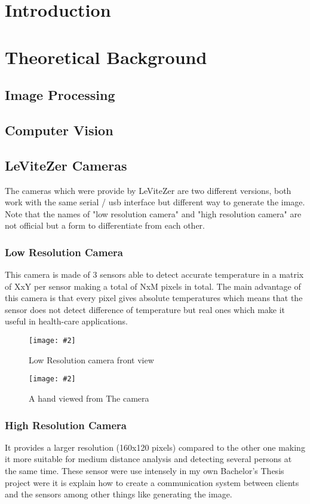 \documentclass[hidelinks,11pt,a4paper,oneside,article]{memoir}
\newcommand{\putimage}[3][10] %
{
    \begin{figure}[h]
        \centering
        \captionsetup{justification=centering}
        \texttt{[image: \#2]}
        \caption{#3}
        \label{fig:#2}
    \end{figure}
}
\begin{document}
	\setcounter{page}{1} %
	\ClearWallPaper
	
	\sloppy %
	
	\chapter{Introduction}
    
    \clearpage	
	\chapter{Theoretical Background}
    \section{Image Processing}
    \section{Computer Vision}
    \section{LeViteZer Cameras}
    The cameras which were provide by LeViteZer are two different versions, both work with the same serial / \gls{usb} interface but different way to generate the image. Note that the names of "low resolution camera" and "high resolution camera" are not official but a form to differentiate from each other. 
    \subsection{Low Resolution Camera}
    This camera is made of 3 sensors able to detect accurate temperature in a matrix of XxY per sensor making a total of NxM pixels in total. The main advantage of this camera is that every pixel gives absolute temperatures which means that the sensor does not detect difference of temperature but real ones which make it useful in health-care applications. %
    \putimage{low-resolution}{Low Resolution camera front view}
    \putimage{hand}{A hand viewed from The camera}
    \subsection{High Resolution Camera}
    It provides a larger resolution (160x120 pixels) compared to the other one making it more suitable for medium distance analysis  and detecting several persons at the same time. These sensor were use intensely in my own Bachelor's Thesis project were it is explain how to create a communication system between clients and the sensors among other things like generating the image. 
    
\end{document}

